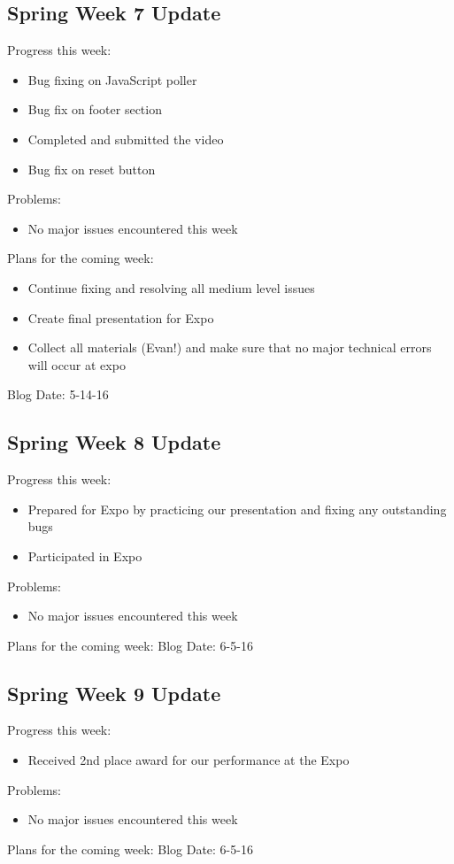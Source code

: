 \subsection{Spring Week 7 Update}
Progress this week:
\begin{itemize}
   \item Bug fixing on JavaScript poller
   \item Bug fix on footer section
   \item Completed and submitted the video
   \item Bug fix on reset button
\end{itemize}
Problems:
\begin{itemize}
   \item No major issues encountered this week
\end{itemize}
Plans for the coming week:
\begin{itemize}
   \item Continue fixing and resolving all medium level issues
   \item Create final presentation for Expo
   \item Collect all materials (Evan!) and make sure that no major technical errors will occur at expo
\end{itemize}
Blog Date: 5-14-16

\subsection{Spring Week 8 Update}
Progress this week:
\begin{itemize}
   \item Prepared for Expo by practicing our presentation and fixing any outstanding bugs
   \item Participated in Expo
\end{itemize}
Problems:
\begin{itemize}
   \item No major issues encountered this week
\end{itemize}
Plans for the coming week:
Blog Date: 6-5-16

\subsection{Spring Week 9 Update}
Progress this week:
\begin{itemize}
   \item Received 2nd place award for our performance at the Expo
\end{itemize}
Problems:
\begin{itemize}
   \item No major issues encountered this week
\end{itemize}
Plans for the coming week:
Blog Date: 6-5-16

